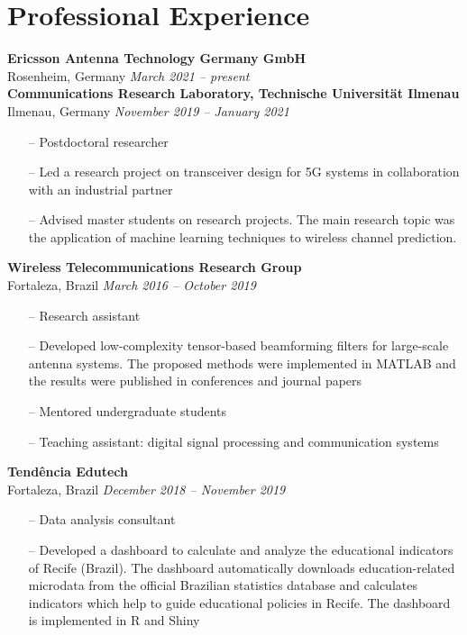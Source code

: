 \section{Professional Experience}

{\bf Ericsson Antenna Technology Germany GmbH}\\
Rosenheim, Germany \hfill {\it March 2021 -- present} \\

{\bf Communications Research Laboratory, Technische Universit\"at Ilmenau}\\
Ilmenau, Germany  \hfill {\it November 2019 -- January 2021} \\
\begin{itemize}
	\item[--] Postdoctoral researcher
	\item[--] Led a research project on transceiver design for 5G systems in collaboration with an industrial partner
	\item[--] Advised master students on research projects. The main research topic was the application of machine learning techniques to wireless channel prediction.
\end{itemize}

{\bf Wireless Telecommunications Research Group}\\
Fortaleza, Brazil \hfill {\it March 2016 -- October 2019}\\
\begin{itemize}
	\item[--] Research assistant
	\item[--] Developed low-complexity tensor-based beamforming filters for large-scale antenna systems. The proposed methods were implemented in MATLAB and the results were published in conferences and journal papers
	\item[--] Mentored undergraduate students
	\item[--] Teaching assistant: digital signal processing and communication systems
\end{itemize}

{\bf Tendência Edutech}\\
Fortaleza, Brazil \hfill {\it December 2018 -- November 2019}\\
\begin{itemize}
	\item[--] Data analysis consultant
	\item[--] Developed a dashboard to calculate and analyze the educational indicators of Recife (Brazil). The dashboard automatically downloads education-related microdata from the official Brazilian statistics database and calculates indicators which help to guide educational policies in Recife. The dashboard is implemented in R and Shiny
\end{itemize}


